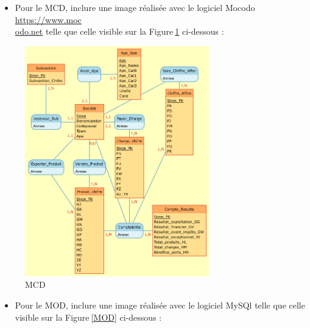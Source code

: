 \documentclass[mstat,12pt]{unswthesis}
\begin{document}
\begin{itemize}
\tightlist
\item
  Pour le MCD, inclure une image réalisée avec le logiciel Mocodo
  \href{https://www.mocodo.net/?mcd=eNqNksFu2zAMhu96Ch0dQAOW7Zab67ZK2zTL4ixtcjEUh14FOJKhyFm3N_J9b-AX62_HaOMEAwb4Ay1SIvlLjMvNQRmvrRnxWDsywe3DQPD43R296MwRCw9Wu7AgMRzy2Ka6rnxdieGUwyfJsKMZNUsBpmrX2kj5z50ddvZLZ7-Kid5QniNNZLfEMoXyTTWUC7OM3EWpLpggiq2j0BgixhyldLClQ8uC945wnPkQ0u1_D49auYJfk7E7fdwjeNNKYfde5WJhf8GBZtlM_SYXvSj380w_b7tq_Ena3lNX5KzT05u9DcE1kOAePIIp-AZm4DuYM3bzWljnyc2c3ZbaX9btAv3CSzJbR01Il_97pi-g12sMFuAHWIIn8AxWYC24_PNp9cxGDN9Z5pMsEiLlA5gAiJUQKyFWQuwYlzG-AhHApaxvBF8h-WrNIrsrvNroXHtqH79Z05z2Ze5VTxm_nA1xoVX866VO0_bEz-uqdfqEXovcavxhQgIpe7FMG2VSTS6Qy4H48Ktm6hK9K-q_fh_Ip7OEKRVNNkN5ML5DbGExcUlxbHkfjCcDcXSlbc_wPGLXVV2Zusp0SklBGI5gPB2wN-SeTJ4=}{https://www.moc\\odo.net}
  telle que celle visible sur la Figure\(~\)\ref{MCD} ci-dessous :
\end{itemize}

\begin{figure}
\centering
\includegraphics[width=8cm,height=10cm]{MCD.png}
\caption{MCD}\label{MCD}
\end{figure}

\begin{itemize}
\tightlist
\item
  Pour le MOD, inclure une image réalisée avec le logiciel MySQl
  \newline telle que celle visible sur la Figure\(~\)\ref{MOD}
  ci-dessous :
\end{itemize}
\end{document}
